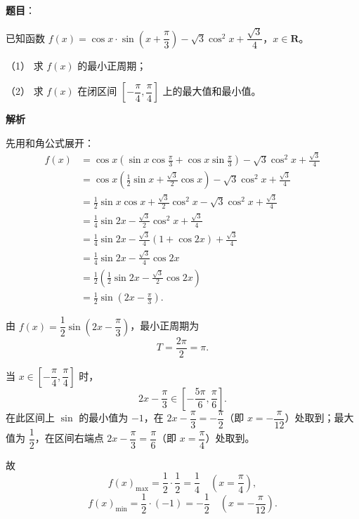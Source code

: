 \begin{answer}

\textbf{题目}：

已知函数 $f(x)=\cos x\cdot\sin\left(x+\dfrac\pi3\right)-\sqrt3\cos^2x+\dfrac{\sqrt3}{4}$，$x\in\mathbf R$。

（1） 求 $f(x)$ 的最小正周期；

（2） 求 $f(x)$ 在闭区间 $\left[-\dfrac\pi4,\dfrac\pi4\right]$ 上的最大值和最小值。

\textbf{解析}

先用和角公式展开：
\nopagebreak[4]
\[\begin{aligned}
f(x)&=\cos x\left(\sin x\cos\frac\pi3+\cos x\sin\frac\pi3\right)-\sqrt3\cos^2x+\frac{\sqrt3}{4}\\
&=\cos x\left(\frac12\sin x+\frac{\sqrt3}{2}\cos x\right)-\sqrt3\cos^2x+\frac{\sqrt3}{4}\\
&=\frac12\sin x\cos x+\frac{\sqrt3}{2}\cos^2x-\sqrt3\cos^2x+\frac{\sqrt3}{4}\\
&=\frac14\sin2x-\frac{\sqrt3}{2}\cos^2x+\frac{\sqrt3}{4}\\
&=\frac14\sin2x-\frac{\sqrt3}{4}(1+\cos2x)+\frac{\sqrt3}{4}\\
&=\frac14\sin2x-\frac{\sqrt3}{4}\cos2x\\
&=\frac12\left(\frac12\sin2x-\frac{\sqrt3}{2}\cos2x\right)\\
&=\frac12\sin\left(2x-\frac\pi3\right).
\end{aligned}\]


由 $f(x)=\dfrac12\sin\left(2x-\dfrac\pi3\right)$，最小正周期为
\nopagebreak[4]
\[T=\frac{2\pi}{2}=\pi.\]


当 $x\in\left[-\dfrac\pi4,\dfrac\pi4\right]$ 时，
\nopagebreak[4]
\[2x-\frac\pi3\in\left[-\frac{5\pi}{6},\frac\pi6\right].\]
在此区间上 $\sin$ 的最小值为 $-1$，在 $2x-\dfrac\pi3=-\dfrac\pi2$（即 $x=-\dfrac{\pi}{12}$）处取到；最大值为 $\dfrac12$，在区间右端点 $2x-\dfrac\pi3=\dfrac\pi6$（即 $x=\dfrac\pi4$）处取到。

故
\nopagebreak[4]
\[f(x)_{\max}=\frac12\cdot\frac12=\frac14\quad\left(x=\frac\pi4\right),\]
\nopagebreak[4]
\[f(x)_{\min}=\frac12\cdot(-1)=-\frac12\quad\left(x=-\frac{\pi}{12}\right).\]



\end{answer}
